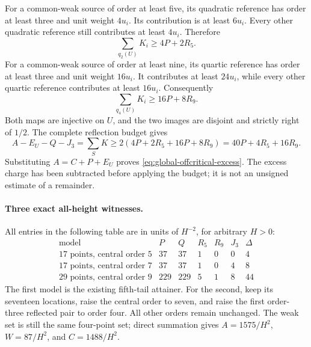 For a common-weak source of order at least five, its quadratic
reference has order at least three and unit weight \(4u_i\).
Its contribution is at least \(6u_i\). Every other quadratic
reference still contributes at least \(4u_i\). Therefore
\[
 \sum_{q_2(U)}K_i\ge4P+2R_5.
\]
For a common-weak source of order at least nine, its quartic
reference has order at least three and unit weight \(16u_i\).
It contributes at least \(24u_i\), while every other quartic
reference contributes at least \(16u_i\). Consequently
\[
 \sum_{q_4(U)}K_i\ge16P+8R_9.
\]
Both maps are injective on \(U\), and the two images are disjoint
and strictly right of \(1/2\). The complete reflection budget gives
\[
 A-E_U-Q-J_3=\sum_S K
 \ge2(4P+2R_5+16P+8R_9)
 =40P+4R_5+16R_9.
\]
Substituting \(A=C+P+E_U\) proves
\eqref{eq:global-offcritical-excess}. The excess charge has been
subtracted before applying the budget; it is not an unsigned
estimate of a remainder.

\paragraph{Three exact all-height witnesses.}
All entries in the following table are in units of \(H^{-2}\),
for arbitrary \(H>0\):
\[
\begin{array}{c|rrrrrr}
 \text{model}&P&Q&R_5&R_9&J_3&\Delta\\ \hline
 17\text{ points, central order }5&37&37&1&0&0&4\\
 17\text{ points, central order }7&37&37&1&0&4&8\\
 29\text{ points, central order }9&229&229&5&1&8&44
\end{array}
\]
The first model is the existing fifth-tail attainer.
For the second, keep its seventeen locations, raise the central
order to seven, and raise the first order-three reflected pair
to order four. All other orders remain unchanged. The weak set
is still the same four-point set; direct summation gives
\(A=1575/H^2\), \(W=87/H^2\), and \(C=1488/H^2\).

